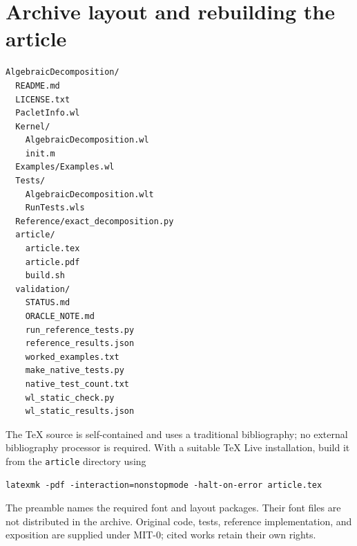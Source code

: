 \documentclass[11pt,letterpaper]{article}
\theoremstyle{definition}
\theoremstyle{remark}
\newcommand{\wt}[1]{\texttt{#1}}
\begin{document}
\section{Archive layout and rebuilding the article}
\begin{lstlisting}[language={}]
AlgebraicDecomposition/
  README.md
  LICENSE.txt
  PacletInfo.wl
  Kernel/
    AlgebraicDecomposition.wl
    init.m
  Examples/Examples.wl
  Tests/
    AlgebraicDecomposition.wlt
    RunTests.wls
  Reference/exact_decomposition.py
  article/
    article.tex
    article.pdf
    build.sh
  validation/
    STATUS.md
    ORACLE_NOTE.md
    run_reference_tests.py
    reference_results.json
    worked_examples.txt
    make_native_tests.py
    native_test_count.txt
    wl_static_check.py
    wl_static_results.json
\end{lstlisting}
The TeX source is self-contained and uses a traditional bibliography;
no external bibliography processor is required. With a suitable TeX Live
installation, build it from the \wt{article} directory using
\begin{lstlisting}[language={}]
latexmk -pdf -interaction=nonstopmode -halt-on-error article.tex
\end{lstlisting}
The preamble names the required font and layout packages. Their font
files are not distributed in the archive. Original code, tests, reference
implementation, and exposition are supplied under MIT-0; cited works
retain their own rights.
\end{document}
